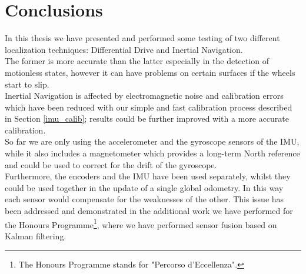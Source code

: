 \chapter{Conclusions}

In this thesis we have presented and performed some testing of two different localization techniques: Differential Drive and Inertial Navigation.\\
The former is more accurate than the latter especially in the detection of motionless states, however it can have problems on certain surfaces if the wheels start to slip.\\
Inertial Navigation is affected by electromagnetic noise and calibration errors which have been reduced with our simple and fast calibration process described in Section \ref{imu_calib}; results could be further improved with a more accurate calibration.\\

So far we are only using the accelerometer and the gyroscope sensors of the IMU, while it also includes a magnetometer which provides a long-term North reference and could be used to correct for the drift of the gyroscope\supercite{magnetometer_in_inertial_nav}.\\

Furthermore, the encoders and the IMU have been used separately, whilst they could be used together in the update of a single global odometry. In this way each sensor would compensate for the weaknesses of the other. This issue has been addressed and demonstrated in the additional work we have performed for the Honours Programme\footnote{The Honours Programme stands for "Percorso d'Eccellenza".}, where we have performed sensor fusion based on Kalman filtering.
